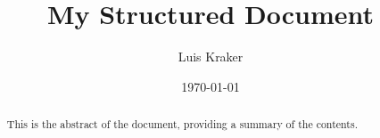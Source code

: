 \documentclass[12pt]{report}
\begin{document}
\title{My Structured Document}
\author{Luis Kraker}
\date{\today}

\maketitle

\begin{abstract}
This is the abstract of the document, providing a summary of the contents.
\end{abstract}

\tableofcontents
\newpage






\newpage


\appendix



\end{document}
